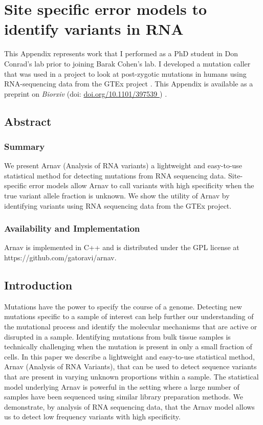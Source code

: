 
\chapter{Site specific error models to identify variants in RNA}
\label{chap:appendix A}

\vspace{2in}

This Appendix represents work that I performed as a PhD student in Don Conrad's lab prior to joining Barak Cohen's lab. I developed a mutation caller that was used in a project to look at post-zygotic mutations in humans using RNA-sequencing data from the GTEx project \cite{rockweiler2021a}. This Appendix is available as a preprint on \textit{Biorxiv} (doi: \href{https://www.biorxiv.org/content/10.1101/397539v1}{doi.org/10.1101/397539 }) \cite{ramu2018a}.

\newpage

\section{Abstract}

\subsection{Summary}
We present Arnav (Analysis of RNA variants) a lightweight and easy-to-use statistical method for detecting mutations from RNA sequencing data. Site-specific error models allow Arnav to call variants with high specificity when the true variant allele fraction is unknown. We show the utility of Arnav by identifying variants using RNA sequencing data from the GTEx project.

\subsection{Availability and Implementation} 
Arnav is implemented in C++ and is distributed under the GPL license at https://github.com/gatoravi/arnav.

\section{Introduction}

Mutations have the power to specify the course of a genome. Detecting new mutations specific to a sample of interest can help further our understanding of the mutational process and identify the molecular mechanisms that are active or disrupted in a sample. Identifying mutations from bulk tissue samples is technically challenging when the mutation is present in only a small fraction of cells. In this paper we describe a lightweight and easy-to-use statistical method, Arnav (Analysis of RNA Variants), that can be used to detect sequence variants that are present in varying unknown proportions within a sample. The statistical model underlying Arnav is powerful in the setting where a large number of samples have been sequenced using similar library preparation methods. We demonstrate, by analysis of RNA sequencing data, that the Arnav model allows us to detect low frequency variants with high specificity.

